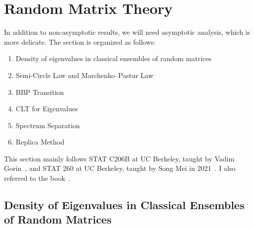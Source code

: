 \newpage
\section{Random Matrix Theory}
In addition to non-asymptotic results, we will need asymptotic analysis, which is more delicate. The section is organized as follows: 
\begin{enumerate}
    \item Density of eigenvalues in classical ensembles of random matrices
    \item Semi-Circle Law and Marchenko–Pastur Law
    \item BBP Transition
    \item CLT for Eigenvalues
    \item Spectrum Separation
    \item Replica Method
\end{enumerate}

This section mainly follows STAT C206B at UC Berkeley, taught by Vadim Gorin~\cite{gorinBerkeleyStatC206B}, and STAT 260 at UC Berkeley, taught by Song Mei in 2021~\cite{meiBerkeleyStat260}. I also referred to the book~\cite{bai2010spectral}.

\subsection{Density of Eigenvalues in Classical Ensembles of Random Matrices}

